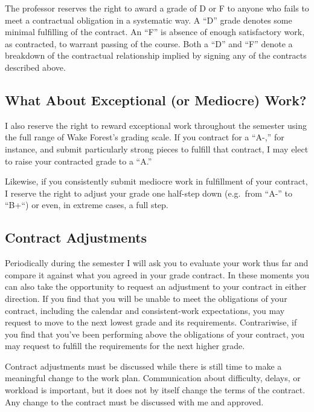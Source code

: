 \documentclass[
]{book}
\begin{document}
The professor reserves the right to award a grade of D or F to anyone who fails to meet a contractual obligation in a systematic way. A ``D'' grade denotes some minimal fulfilling of the contract. An ``F'' is absence of enough satisfactory work, as contracted, to warrant passing of the course. Both a ``D'' and ``F'' denote a breakdown of the contractual relationship implied by signing any of the contracts described above.

\subsection*{What About Exceptional (or Mediocre) Work?}\label{what-about-exceptional-or-mediocre-work}


I also reserve the right to reward exceptional work throughout the semester using the full range of Wake Forest's grading scale. If you contract for a ``A-,'' for instance, and submit particularly strong pieces to fulfill that contract, I may elect to raise your contracted grade to a ``A.''

Likewise, if you consistently submit mediocre work in fulfillment of your contract, I reserve the right to adjust your grade one half-step down (e.g.~from ``A-'' to ``B+``) or even, in extreme cases, a full step.

\subsection*{Contract Adjustments}\label{contract-adjustments}


Periodically during the semester I will ask you to evaluate your work thus far and compare it against what you agreed in your grade contract. In these moments you can also take the opportunity to request an adjustment to your contract in either direction. If you find that you will be unable to meet the obligations of your contract, including the calendar and consistent-work expectations, you may request to move to the next lowest grade and its requirements. Contrariwise, if you find that you've been performing above the obligations of your contract, you may request to fulfill the requirements for the next higher grade.

Contract adjustments must be discussed while there is still time to make a meaningful change to the work plan. Communication about difficulty, delays, or workload is important, but it does not by itself change the terms of the contract. Any change to the contract must be discussed with me and approved.
\end{document}
